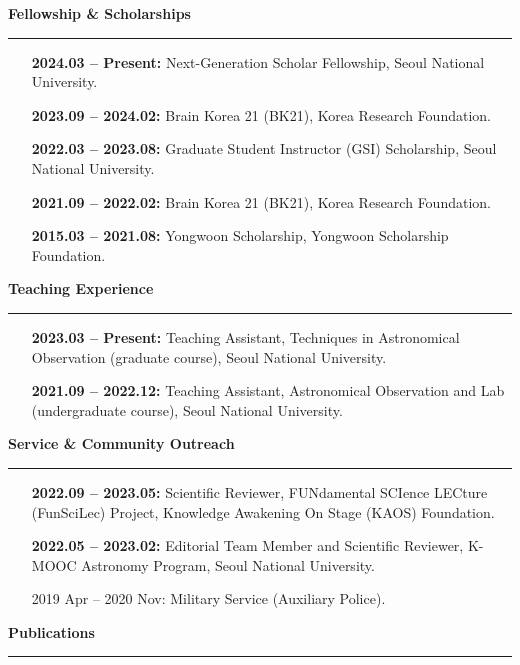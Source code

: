 \documentclass[11pt]{article}
\begin{document}
\textbf{\large \textsf{Fellowship \& Scholarships}}
\vspace{3pt}
\hrule
\begin{itemize}[leftmargin=115pt, noitemsep]
    \item[\textbf{2024.03 -- Present:}] Next-Generation Scholar Fellowship, Seoul National University.
    \item[\textbf{2023.09 -- 2024.02:}] Brain Korea 21 (BK21), Korea Research Foundation.
    \item[\textbf{2022.03 -- 2023.08:}] Graduate Student Instructor (GSI) Scholarship, Seoul National University.
    \item[\textbf{2021.09 -- 2022.02:}] Brain Korea 21 (BK21), Korea Research Foundation.
    \item[\textbf{2015.03 -- 2021.08:}] Yongwoon Scholarship, Yongwoon Scholarship Foundation.
\end{itemize}


\textbf{\large \textsf{Teaching Experience}}
\vspace{3pt}
\hrule
\begin{itemize}[leftmargin=115pt, noitemsep]
    \item[\textbf{2023.03 -- Present:}] Teaching Assistant, Techniques in Astronomical Observation (graduate course), Seoul National University.
    \item[\textbf{2021.09 -- 2022.12:}] Teaching Assistant, Astronomical Observation and Lab (undergraduate course), Seoul National University.
\end{itemize}


\textbf{\large \textsf{Service \& Community Outreach}}
\vspace{3pt}
\hrule
\begin{itemize}[leftmargin=115pt, noitemsep]
    \item[\textbf{2022.09 -- 2023.05:}] Scientific Reviewer, FUNdamental SCIence LECture (FunSciLec) Project, Knowledge Awakening On Stage (KAOS) Foundation.
    \item[\textbf{2022.05 -- 2023.02:}] Editorial Team Member and Scientific Reviewer, K-MOOC Astronomy Program, Seoul National University.
    \item[2019 Apr -- 2020 Nov:] Military Service (Auxiliary Police).
\end{itemize}


\textbf{\large \textsf{Publications}}
\vspace{3pt}
\hrule

\begin{etaremune}
    \item {}
    \item {}
    \item {}
\end{etaremune}

% 

\end{document}
